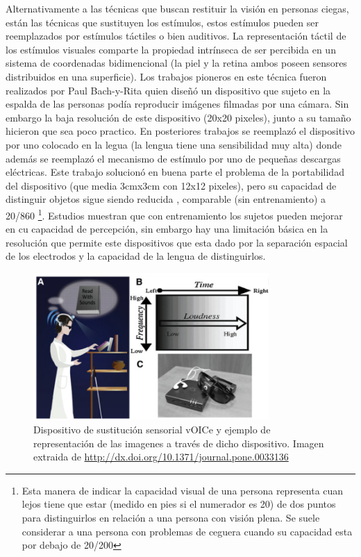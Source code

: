 \documentclass{article}
\begin{document}
    Alternativamente a las técnicas que buscan restituir la visión en personas ciegas, están las técnicas que sustituyen los estímulos, estos estímulos pueden ser reemplazados por estímulos táctiles o bien auditivos. La representación táctil de los estímulos visuales comparte la propiedad intrínseca de ser percibida en un sistema de coordenadas bidimencional (la piel y la retina ambos poseen sensores distribuidos en una superficie). Los trabajos pioneros en este técnica fueron realizados por Paul Bach-y-Rita \cite{Tactil1} quien diseñó un dispositivo que sujeto en la espalda de las personas podía reproducir imágenes filmadas por una cámara. Sin embargo la baja resolución de este dispositivo (20x20 pixeles), junto a su tamaño hicieron que sea poco practico. En posteriores trabajos \cite{Tactil2} se reemplazó el dispositivo por uno colocado en la legua (la lengua tiene una sensibilidad muy alta) donde además se reemplazó el mecanismo de estímulo por uno de pequeñas descargas eléctricas. Este trabajo solucionó en buena parte el problema de la portabilidad del dispositivo (que media 3cmx3cm con 12x12 pixeles), pero su capacidad de distinguir objetos sigue siendo reducida \cite{Tactil3}, comparable (sin entrenamiento) a 20/860 \footnote{Esta manera de indicar la capacidad visual de una persona representa cuan lejos tiene que estar (medido en pies si el numerador es 20) de dos puntos para distinguirlos en relación a una persona con visión plena. Se suele considerar a una persona con problemas de ceguera cuando su capacidad esta por debajo de 20/200}. Estudios \cite{Tactil4} muestran que con entrenamiento los sujetos pueden mejorar en cu capacidad de percepción, sin embargo hay una limitación básica en la resolución que permite este dispositivos que esta dado por la separación espacial de los electrodos y la capacidad de la lengua de distinguirlos. 
    
    \begin{figure}
        \center
        \includegraphics[width=0.8\textwidth]{Imagenes/Voice2.png}
        \caption{Dispositivo de sustitución sensorial vOICe y ejemplo de representación de las imagenes a través de dicho dispositivo. Imagen extraida de \url{http://dx.doi.org/10.1371/journal.pone.0033136}}
        \label{fig:Voice2}
    \end{figure}
    
\end{document}
